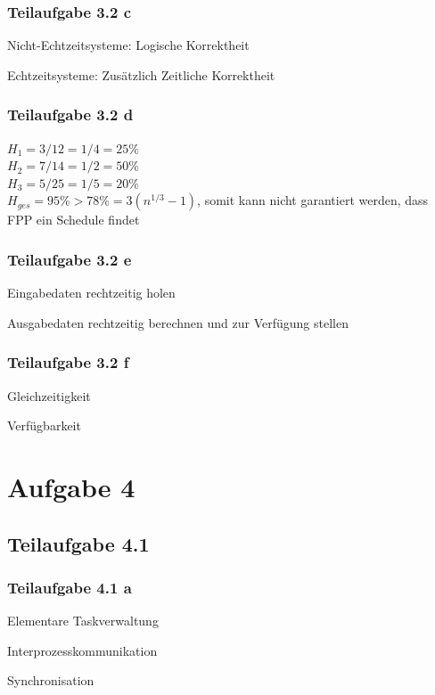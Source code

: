 \documentclass[a4paper]{scrartcl}
\begin{document}
  \subsubsection*{Teilaufgabe 3.2 c}
  Nicht-Echtzeitsysteme: Logische Korrektheit

  Echtzeitsysteme: Zusätzlich Zeitliche Korrektheit


  \subsubsection*{Teilaufgabe 3.2 d}
  $H_1 = 3/12 = 1/4 = 25\%$ \\
  $H_2 = 7/14 = 1/2 = 50\%$ \\
  $H_3 = 5/25 = 1/5 = 20\%$ \\
  $H_{ges} = 95\% > 78\% = 3 (n^{1/3} - 1)$, somit kann nicht garantiert werden, dass FPP ein Schedule findet


  \subsubsection*{Teilaufgabe 3.2 e}
  \begin{enumerate*}[label=(\arabic*)]
      \item Eingabedaten rechtzeitig holen \\
      \item Ausgabedaten rechtzeitig berechnen und zur Verfügung stellen
  \end{enumerate*}

  \subsubsection*{Teilaufgabe 3.2 f}
  \begin{enumerate*}[label=(\arabic*)]
      \item Gleichzeitigkeit
      \item Verfügbarkeit
  \end{enumerate*}

  \section*{Aufgabe 4}
  \subsection*{Teilaufgabe 4.1}
  \subsubsection*{Teilaufgabe 4.1 a}
  \begin{enumerate*}[label=(\arabic*)]
      \item Elementare Taskverwaltung
      \item Interprozesskommunikation
      \item Synchronisation
  \end{enumerate*}
\end{document}
